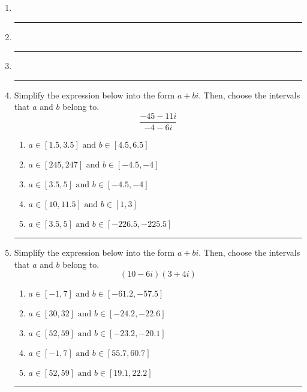 \documentclass[14pt]{extbook}
\newcommand{\litem}[1]{\item#1\hspace*{-1cm}\rule{\textwidth}{0.4pt}}
\begin{document}
\begin{enumerate}
\litem{
\begin{enumerate}[label=\Alph*.]

\end{enumerate} }
\litem{
\begin{enumerate}[label=\Alph*.]

\end{enumerate} }
\litem{
\begin{enumerate}[label=\Alph*.]

\end{enumerate} }
\litem{
Simplify the expression below into the form $a+bi$. Then, choose the intervals that $a$ and $b$ belong to.\[ \frac{-45 - 11 i}{-4 - 6 i} \]\begin{enumerate}[label=\Alph*.]
\item \( a \in [1.5, 3.5] \text{ and } b \in [4.5, 6.5] \)
\item \( a \in [245, 247] \text{ and } b \in [-4.5, -4] \)
\item \( a \in [3.5, 5] \text{ and } b \in [-4.5, -4] \)
\item \( a \in [10, 11.5] \text{ and } b \in [1, 3] \)
\item \( a \in [3.5, 5] \text{ and } b \in [-226.5, -225.5] \)

\end{enumerate} }
\litem{
Simplify the expression below into the form $a+bi$. Then, choose the intervals that $a$ and $b$ belong to.\[ (10 - 6 i)(3 + 4 i) \]\begin{enumerate}[label=\Alph*.]
\item \( a \in [-1, 7] \text{ and } b \in [-61.2, -57.5] \)
\item \( a \in [30, 32] \text{ and } b \in [-24.2, -22.6] \)
\item \( a \in [52, 59] \text{ and } b \in [-23.2, -20.1] \)
\item \( a \in [-1, 7] \text{ and } b \in [55.7, 60.7] \)
\item \( a \in [52, 59] \text{ and } b \in [19.1, 22.2] \)

\end{enumerate} }
\end{enumerate}
\end{document}
